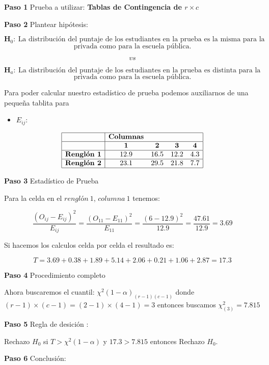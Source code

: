 \documentclass[
  a4paper,
  oneside,
  openany]{book}
\providecommand{\tightlist}{%
  \setlength{\itemsep}{0pt}\setlength{\parskip}{0pt}}
\begin{document}
\textbf{Paso 1} Prueba a utilizar: \textbf{Tablas de Contingencia de \(r\times c\)}

\textbf{Paso 2} Plantear hipótesis:

\[\textbf{H}_0: \ \mbox{La distribución del puntaje de los estudiantes en la prueba es la misma para la escuela}\]
\[\mbox{privada como para la escuela pública.}\]

\[vs\]

\[\textbf{H}_a: \ \mbox{La distribución del puntaje de los estudiantes en la prueba es distinta para la escuela}\]
\[\mbox{privada como para la escuela pública.}\]

Para poder calcular nuestro estadístico de prueba podemos auxiliarnos de una pequeña tablita para

\begin{itemize}
\tightlist
\item
  \(E_{ij}:\)
\end{itemize}

\[
\begin{array}{ |c|cccc|  }
\hline
&\textbf{Columnas} & & &\\
\hline
&\textbf{1} & \textbf{2} & \textbf{3} & \textbf{4} \\
\hline
\textbf{Renglón 1} & 12.9   & 16.5 & 12.2 & 4.3 \\
\hline
\textbf{Renglón 2} & 23.1   & 29.5 & 21.8 & 7.7 \\
\hline
\end{array}
\]

\textbf{Paso 3} Estadístico de Prueba

Para la celda en el \(renglón\ 1\), \(columna\ 1\) tenemos:

\[\frac{(O_{ij}-E_{ij})^2}{E_{ij}}= \frac{(O_{11}-E_{11})^2}{E_{11}}=\frac{(6-12.9)^2}{12.9}=\frac{47.61}{12.9}=3.69\]

Si hacemos los calculos celda por celda el resultado es:

\[T=3.69+0.38+1.89+5.14+2.06+0.21+1.06+2.87=17.3\]

\textbf{Paso 4} Procedimiento completo

Ahora buscaremos el cuantil: \(\chi^2(1-\alpha)_{(r-1)(c-1)}\) donde \((r-1)\times(c-1)=(2-1)\times(4-1)=3\)
entonces buscamos \(\chi^2_{(3)}=7.815\)

\textbf{Paso 5} Regla de desición :

Rechazo \(H_0\) si \(T> \chi^2(1-\alpha)\) y \(17.3> 7.815\) entonces Rechazo \(H_0\).

\textbf{Paso 6} Conclusión:
\end{document}
